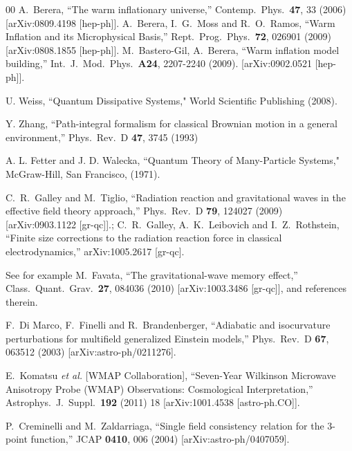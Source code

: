 \documentclass[11pt,amsmath,floats,floatfix,nofootinbib,secnumarabic, superscriptaddress, tightenlines]{revtex4}
\begin{document}
{\begin{thebibliography}{00}
   A.~Berera,
  ``The warm inflationary universe,''
  Contemp.\ Phys.\  {\bf 47}, 33 (2006)
  [arXiv:0809.4198 [hep-ph]].  A.~Berera, I.~G.~Moss and R.~O.~Ramos,
  ``Warm Inflation and its Microphysical Basis,''
  Rept.\ Prog.\ Phys.\  {\bf 72}, 026901 (2009)
  [arXiv:0808.1855 [hep-ph]]. M.~Bastero-Gil, A.~Berera, ``Warm inflation model building,''
  Int.\ J.\ Mod.\ Phys.\  {\bf A24}, 2207-2240 (2009). [arXiv:0902.0521 [hep-ph]].


 U. Weiss, ``Quantum Dissipative Systems,"  World Scientific Publishing (2008).


 Y. Zhang, ``Path-integral formalism for classical Brownian motion in a general environment,''
  Phys.\ Rev.\  D {\bf 47}, 3745 (1993)

A. L. Fetter and J. D. Walecka,  ``Quantum Theory of Many-Particle Systems," McGraw-Hill, San Francisco, (1971).

  C.~R.~Galley and M.~Tiglio,
  ``Radiation reaction and gravitational waves in the effective field theory
  approach,''  Phys.\ Rev.\  D {\bf 79}, 124027 (2009)
  [arXiv:0903.1122 [gr-qc]].; C.~R.~Galley, A.~K.~Leibovich and I.~Z.~Rothstein,
  ``Finite size corrections to the radiation reaction force in classical electrodynamics,''
  arXiv:1005.2617 [gr-qc].

  See for example  M.~Favata,
  ``The gravitational-wave memory effect,'' Class.\ Quant.\ Grav.\  {\bf 27}, 084036 (2010)
  [arXiv:1003.3486 [gr-qc]], and references therein.



 F.~Di Marco, F.~Finelli and R.~Brandenberger,
  ``Adiabatic and isocurvature perturbations for multifield generalized
  Einstein models,''
  Phys.\ Rev.\  D {\bf 67}, 063512 (2003)
  [arXiv:astro-ph/0211276].

  E.~Komatsu {\it et al.}  [WMAP Collaboration],
  ``Seven-Year Wilkinson Microwave Anisotropy Probe (WMAP) Observations:
  Cosmological Interpretation,''
  Astrophys.\ J.\ Suppl.\  {\bf 192} (2011) 18
  [arXiv:1001.4538 [astro-ph.CO]].

  P.~Creminelli and M.~Zaldarriaga,
  ``Single field consistency relation for the 3-point function,''
  JCAP {\bf 0410}, 006 (2004)
  [arXiv:astro-ph/0407059].


\end{thebibliography}}
\end{document}

